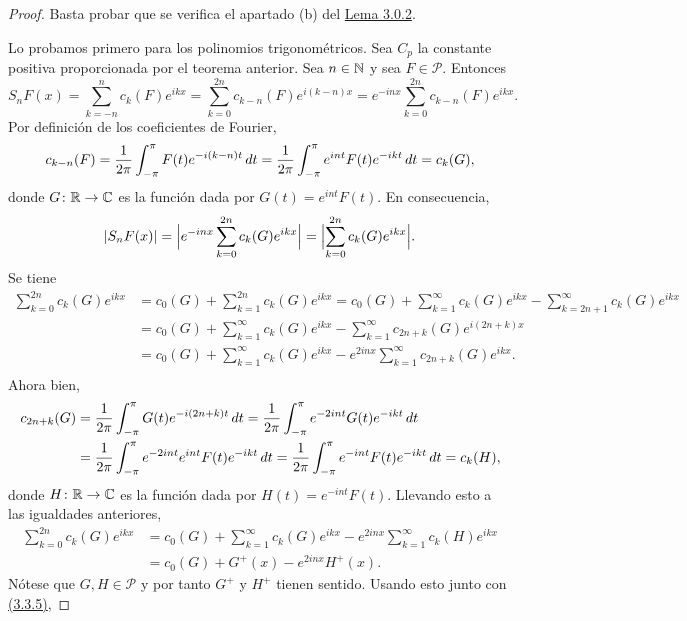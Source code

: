\documentclass[a4paper, 12pt, oneside]{book}
\begin{document}
\begin{proof}
    Basta probar que se verifica el apartado (b) del \hyperref[3.0.2]{\color{blue}Lema 3.0.2}. 
    
    Lo probamos primero para los polinomios trigonométricos. Sea $C_p$ la constante positiva proporcionada por el teorema anterior. Sea $n \in \mathbb N$ y sea  $F \in \mathcal{P}$. Entonces
    \[S_nF(x) = \sum_{k=-n}^n c_k(F)e^{ikx} = \sum_{k=0}^{2n}c_{k-n}(F)e^{i(k-n)x} = e^{-inx}\sum_{k=0}^{2n}c_{k-n}(F)e^{ikx}.\]
    Por definición de los coeficientes de Fourier,
    \[c_{k-n}(F) = \frac{1}{2\pi}\int_{-\pi}^{\pi} F(t)e^{-i(k-n)t} \, dt = \frac{1}{2\pi}\int_{-\pi}^{\pi} e^{int}F(t)e^{-ikt} \, dt = c_k(G),\]
    donde $G \colon \mathbb R \to \mathbb C$ es la función dada por $G(t)=e^{int}F(t)$. En consecuencia,
    \begin{equation}\label{3.3.5}
    |S_nF(x)| = \Bigl|e^{-inx}\sum_{k=0}^{2n}c_k(G)e^{ikx}\Bigr|= \Bigl|\sum_{k=0}^{2n}c_k(G)e^{ikx}\Bigr|.
    \end{equation}
    Se tiene
    \begin{align*}
        \sum_{k=0}^{2n}c_k(G)e^{ikx} &= c_0(G)+ \sum_{k=1}^{2n} c_k(G)e^{ikx} = c_0(G)+\sum_{k=1}^{\infty} c_k(G)e^{ikx} - \sum_{k=2n+1}^{\infty} c_k(G)e^{ikx} \\
        &= c_0(G) + \sum_{k=1}^{\infty} c_k(G)e^{ikx} - \sum_{k=1}^{\infty} c_{2n+k}(G)e^{i(2n+k)x} \\
        &= c_0(G) + \sum_{k=1}^{\infty} c_k(G)e^{ikx} - e^{2inx}\sum_{k=1}^{\infty} c_{2n+k}(G)e^{ikx}. \\
    \end{align*}
    Ahora bien,
    \begin{align*}
        c_{2n+k}(G) &= \frac{1}{2\pi}\int_{-\pi}^{\pi} G(t)e^{-i(2n+k)t} \, dt = \frac{1}{2\pi}\int_{-\pi}^{\pi} e^{-2int}G(t)e^{-ikt} \, dt \\
        &=  \frac{1}{2\pi}\int_{-\pi}^{\pi} e^{-2int}e^{int}F(t)e^{-ikt} \, dt = \frac{1}{2\pi}\int_{-\pi}^{\pi} e^{-int}F(t)e^{-ikt} \, dt = c_k(H),
    \end{align*}
    donde $H \colon \mathbb R \to \mathbb C$ es la función dada por $H(t) = e^{-int}F(t)$. Llevando esto a las igualdades anteriores,
    \begin{align*}
        \sum_{k=0}^{2n}c_k(G)e^{ikx} &= c_0(G) + \sum_{k=1}^{\infty} c_k(G)e^{ikx} - e^{2inx}\sum_{k=1}^{\infty} c_k(H)e^{ikx} \\
        &= c_0(G) + G^+(x) - e^{2inx}H^+(x).
    \end{align*}
    Nótese que $G,H\in\mathcal{P}$ y por tanto $G^+$ y $H^+$ tienen sentido. Usando esto junto con \hyperref[3.3.5]{\color{blue}(3.3.5)},

\end{proof}
\end{document}
